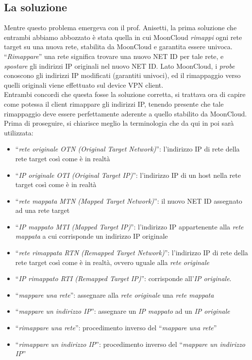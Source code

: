 \subsection{La soluzione}
Mentre questo problema emergeva con il prof. Anisetti, la prima soluzione che entrambi
abbiamo abbozzato è stata quella in cui MoonCloud \textit{rimappi} ogni rete target
su una nuova rete, stabilita da MoonCloud e garantita essere univoca.
``\textit{Rimappare}'' una rete significa trovare una nuovo NET ID per tale rete, e
\textit{spostare} gli indirizzi IP originali nel nuovo NET ID. Lato MoonCloud, i
\textit{probe} conoscono gli indirizzi IP modificati (garantiti univoci), ed il rimappaggio
verso quelli originali viene effettuato sul device VPN client.\\
Entrambi concordi che questa fosse la soluzione corretta, si trattava ora di capire
come potessa il client rimappare gli indirizzi IP, tenendo presente che tale
rimappaggio deve essere perfettamente aderente a quello stabilito da MoonCloud.
Prima di proseguire, si chiarisce meglio la terminologia che da qui in poi sarà utilizzata:
\begin{itemize}
  \item ``\textit{rete originale OTN (Original Target Network)}'': l'indirizzo IP di rete della rete target così come
  è in realtà
  \item ``\textit{IP originale OTI (Original Target IP)}'': l'indirizzo IP di un
  host nella rete target così
  come è in realtà
  \item ``\textit{rete mappata MTN (Mapped Target Network)}'': il nuovo NET ID
  assegnato ad una rete target
  \item ``\textit{IP mappato MTI (Mapped Target IP)}'': l'indirizzo IP appartenente alla \textit{rete
  mappata} a cui corrisponde un indirizzo IP originale
  \item ``\textit{rete rimappata RTN (Remapped Target Network)}'':  l'indirizzo
  IP di rete della rete target così
  come è in realtà, ovvero uguale alla \textit{rete originale}
  \item ``\textit{IP rimappato RTI (Remapped Target IP)}'': corrisponde all'\textit{IP originale}.
  \item ``\textit{mappare una rete}'': assegnare alla \textit{rete originale} una
  \textit{rete mappata}
  \item ``\textit{mappare un indirizzo IP}'': assegnare un \textit{IP mappato}
  ad un \textit{IP originale}
  \item ``\textit{rimappare una rete}'': procedimento inverso del
  ``\textit{mappare una rete}''
  \item ``\textit{rimappare un indirizzo IP}'': procedimento inverso del
  ``\textit{mappare un indirizzo IP}''
\end{itemize}
